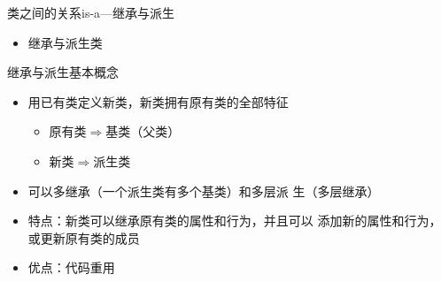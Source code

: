 \begin{frame}[t, fragile]{类之间的关系}{\alert{is-a}---继承与派生}%
  \begin{itemize}
  \item 继承与派生类\\
    \begin{center}
    \end{center}
  \end{itemize}
\end{frame}
\begin{frame}[t, fragile]{继承与派生}{基本概念}%
  \stretchon
  \begin{itemize}
  \item 用已有类定义新类，新类拥有原有类的全部特征
    \begin{itemize}
    \item 原有类$\Rightarrow$\alert{基类（父类）}
    \item 新类$\Rightarrow$\alert{派生类}
    \end{itemize}
  \item 可以\alert{多继承}（一个派生类有多个基类）和\alert{多层派
      生}（多层继承）
  \item 特点：新类可以\alert{继承}原有类的属性和行为，并且可以
    \alert{添加}新的属性和行为，或更新原有类的成员
  \item 优点：\alert{代码重用}
  \end{itemize}
  \stretchoff
\end{frame}

